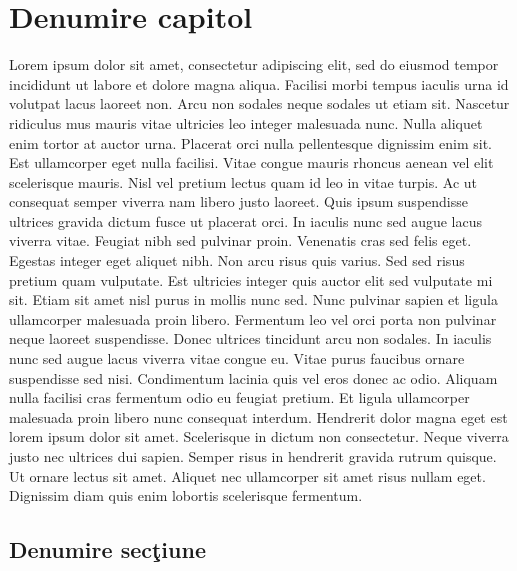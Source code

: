 
\chapter{Denumire capitol}

\ifpdf
    \graphicspath{{Chapter2/Figs/Raster/}{Chapter2/Figs/PDF/}{Chapter2/Figs/}}
\else
    \graphicspath{{Chapter2/Figs/Vector/}{Chapter2/Figs/}}
\fi

Lorem ipsum dolor sit amet, consectetur adipiscing elit, sed do eiusmod tempor incididunt ut labore et dolore magna aliqua. Facilisi morbi tempus iaculis urna id volutpat lacus laoreet non. Arcu non sodales neque sodales ut etiam sit. Nascetur ridiculus mus mauris vitae ultricies leo integer malesuada nunc. Nulla aliquet enim tortor at auctor urna. Placerat orci nulla pellentesque dignissim enim sit. Est ullamcorper eget nulla facilisi. Vitae congue mauris rhoncus aenean vel elit scelerisque mauris. Nisl vel pretium lectus quam id leo in vitae turpis. Ac ut consequat semper viverra nam libero justo laoreet. Quis ipsum suspendisse ultrices gravida dictum fusce ut placerat orci. In iaculis nunc sed augue lacus viverra vitae. Feugiat nibh sed pulvinar proin. Venenatis cras sed felis eget. Egestas integer eget aliquet nibh. Non arcu risus quis varius. Sed sed risus pretium quam vulputate.
Est ultricies integer quis auctor elit sed vulputate mi sit. Etiam sit amet nisl purus in mollis nunc sed. Nunc pulvinar sapien et ligula ullamcorper malesuada proin libero. Fermentum leo vel orci porta non pulvinar neque laoreet suspendisse. Donec ultrices tincidunt arcu non sodales. In iaculis nunc sed augue lacus viverra vitae congue eu. Vitae purus faucibus ornare suspendisse sed nisi. Condimentum lacinia quis vel eros donec ac odio. Aliquam nulla facilisi cras fermentum odio eu feugiat pretium. Et ligula ullamcorper malesuada proin libero nunc consequat interdum. Hendrerit dolor magna eget est lorem ipsum dolor sit amet. Scelerisque in dictum non consectetur. Neque viverra justo nec ultrices dui sapien. Semper risus in hendrerit gravida rutrum quisque. Ut ornare lectus sit amet. Aliquet nec ullamcorper sit amet risus nullam eget. Dignissim diam quis enim lobortis scelerisque fermentum.


\section{Denumire sec\c{t}iune}

